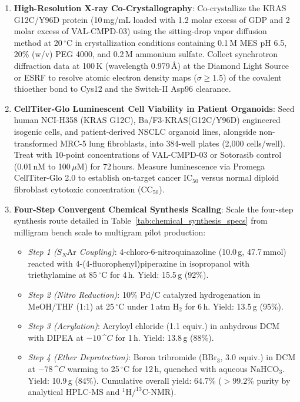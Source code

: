 \begin{enumerate}
    \item \textbf{High-Resolution X-ray Co-Crystallography}:
    Co-crystallize the KRAS G12C/Y96D protein (10\,mg/mL loaded with 1.2 molar excess of GDP and 2 molar excess of VAL-CMPD-03) using the sitting-drop vapor diffusion method at 20\,$^\circ$C in crystallization conditions containing 0.1\,M MES pH 6.5, 20\% (w/v) PEG 4000, and 0.2\,M ammonium sulfate. Collect synchrotron diffraction data at 100\,K (wavelength 0.979\,\AA) at the Diamond Light Source or ESRF to resolve atomic electron density maps ($\sigma \ge 1.5$) of the covalent thioether bond to Cys12 and the Switch-II Asp96 clearance.
    
    \item \textbf{CellTiter-Glo Luminescent Cell Viability in Patient Organoids}:
    Seed human NCI-H358 (KRAS G12C), Ba/F3-KRAS(G12C/Y96D) engineered isogenic cells, and patient-derived NSCLC organoid lines, alongside non-transformed MRC-5 lung fibroblasts, into 384-well plates (2,000 cells/well). Treat with 10-point concentrations of VAL-CMPD-03 or Sotorasib control (0.01\,nM to 100\,$\mu$M) for 72\,hours. Measure luminescence via Promega CellTiter-Glo 2.0 to establish on-target cancer $\text{IC}_{50}$ versus normal diploid fibroblast cytotoxic concentration ($\text{CC}_{50}$).
    
    \item \textbf{Four-Step Convergent Chemical Synthesis Scaling}:
    Scale the four-step synthesis route detailed in Table~\ref{tab:chemical_synthesis_specs} from milligram bench scale to multigram pilot production:
    \begin{itemize}
        \item \textit{Step 1 ($S_N\text{Ar}$ Coupling)}: 4-chloro-6-nitroquinazoline (10.0\,g, 47.7\,mmol) reacted with 4-(4-fluorophenyl)piperazine in isopropanol with triethylamine at 85\,$^\circ$C for 4\,h. Yield: 15.5\,g (92\%).
        \item \textit{Step 2 (Nitro Reduction)}: 10\% Pd/C catalyzed hydrogenation in MeOH/THF (1:1) at 25\,$^\circ$C under 1\,atm $\text{H}_2$ for 6\,h. Yield: 13.5\,g (95\%).
        \item \textit{Step 3 (Acrylation)}: Acryloyl chloride (1.1 equiv.) in anhydrous DCM with DIPEA at $-10\,$^\circ$C$ for 1\,h. Yield: 13.8\,g (88\%).
        \item \textit{Step 4 (Ether Deprotection)}: Boron tribromide ($\text{BBr}_3$, 3.0 equiv.) in DCM at $-78\,$^\circ$C$ warming to 25\,$^\circ$C for 12\,h, quenched with aqueous $\text{NaHCO}_3$. Yield: 10.9\,g (84\%). Cumulative overall yield: 64.7\% ($>99.2\%$ purity by analytical HPLC-MS and $^1\text{H}/^{13}\text{C}$-NMR).
    \end{itemize}
\end{enumerate}

